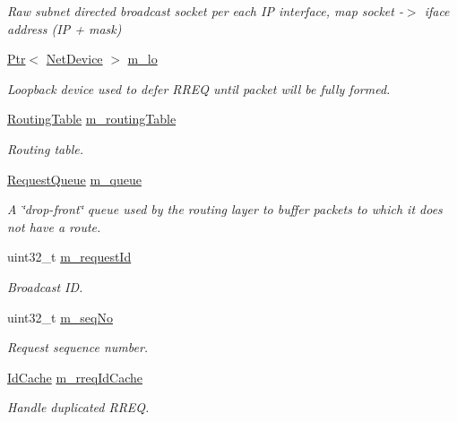 \begin{DoxyCompactItemize}
\begin{DoxyCompactList}\small\item\em Raw subnet directed broadcast socket per each IP interface, map socket -\/$>$ iface address (IP + mask) \end{DoxyCompactList}\item 
\hyperlink{classns3_1_1Ptr}{Ptr}$<$ \hyperlink{classns3_1_1NetDevice}{Net\+Device} $>$ \hyperlink{classns3_1_1aodv_1_1RoutingProtocol_a55d7e550c45e7a211ba8781f1b5b0015}{m\+\_\+lo}
\begin{DoxyCompactList}\small\item\em Loopback device used to defer R\+R\+EQ until packet will be fully formed. \end{DoxyCompactList}\item 
\hyperlink{classns3_1_1aodv_1_1RoutingTable}{Routing\+Table} \hyperlink{classns3_1_1aodv_1_1RoutingProtocol_a4e1003a34c8adc96db71096d88c98ae0}{m\+\_\+routing\+Table}
\begin{DoxyCompactList}\small\item\em Routing table. \end{DoxyCompactList}\item 
\hyperlink{classns3_1_1aodv_1_1RequestQueue}{Request\+Queue} \hyperlink{classns3_1_1aodv_1_1RoutingProtocol_afd2e6004e54cac8abd2d95cec3ee9580}{m\+\_\+queue}
\begin{DoxyCompactList}\small\item\em A \char`\"{}drop-\/front\char`\"{} queue used by the routing layer to buffer packets to which it does not have a route. \end{DoxyCompactList}\item 
uint32\+\_\+t \hyperlink{classns3_1_1aodv_1_1RoutingProtocol_a0075a9d7db2eeb40aaa9066c0a073942}{m\+\_\+request\+Id}
\begin{DoxyCompactList}\small\item\em Broadcast ID. \end{DoxyCompactList}\item 
uint32\+\_\+t \hyperlink{classns3_1_1aodv_1_1RoutingProtocol_abf5ef6b30d0ccf20b9b5ecf7918f67b2}{m\+\_\+seq\+No}
\begin{DoxyCompactList}\small\item\em Request sequence number. \end{DoxyCompactList}\item 
\hyperlink{classns3_1_1aodv_1_1IdCache}{Id\+Cache} \hyperlink{classns3_1_1aodv_1_1RoutingProtocol_a96743ff957b0a878c23e55a84e209d5d}{m\+\_\+rreq\+Id\+Cache}
\begin{DoxyCompactList}\small\item\em Handle duplicated R\+R\+EQ. \end{DoxyCompactList}\item 

\end{DoxyCompactItemize}
